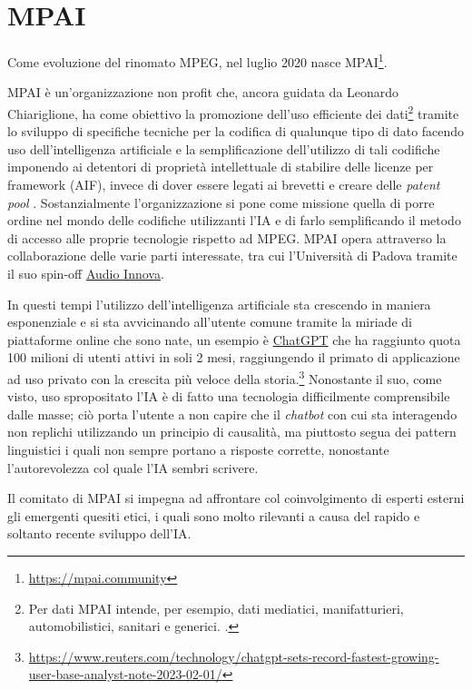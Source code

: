 
\chapter{MPAI} \label{chp:mpai}
Come evoluzione del rinomato \ac{MPEG}, nel luglio 2020 nasce \ac{MPAI}\footnote{\url{https://mpai.community}}.

\ac{MPAI} è un'organizzazione non profit che, ancora guidata da Leonardo Chiariglione, ha come obiettivo la promozione dell'uso efficiente dei dati\footnote{Per dati \ac{MPAI} intende, per esempio, dati mediatici, manifatturieri, automobilistici, sanitari e generici. \cite{mpaiMPAICommunity}.} tramite lo sviluppo di specifiche tecniche per la codifica di qualunque tipo di dato facendo uso dell'intelligenza artificiale e la semplificazione dell'utilizzo di tali codifiche imponendo ai detentori di proprietà intellettuale di stabilire delle licenze per framework (\acs{AIF}), invece di dover essere legati ai brevetti e creare delle \textit{patent pool} \cite{mpaiMPAICommunity}. Sostanzialmente l'organizzazione si pone come missione quella di porre ordine nel mondo delle codifiche utilizzanti l'IA e di farlo semplificando il metodo di accesso alle proprie tecnologie rispetto ad \ac{MPEG}.
\ac{MPAI} opera attraverso la collaborazione delle varie parti interessate, tra cui l'Università di Padova tramite il suo spin-off \href{www.audioinnova.com}{Audio Innova}.

In questi tempi l'utilizzo dell'intelligenza artificiale sta crescendo in maniera esponenziale e si sta avvicinando all'utente comune tramite la miriade di piattaforme online che sono nate, un esempio è \href{https://chat.openai.com}{ChatGPT} che ha raggiunto quota 100 milioni di utenti attivi in soli 2 mesi, raggiungendo il primato di applicazione ad uso privato con la crescita più veloce della storia.\footnote{\url{https://www.reuters.com/technology/chatgpt-sets-record-fastest-growing-user-base-analyst-note-2023-02-01/}} Nonostante il suo, come visto, uso spropositato l'IA è di fatto una tecnologia difficilmente comprensibile dalle masse; ciò porta l'utente a non capire che il \textit{chatbot} con cui sta interagendo non replichi utilizzando un principio di causalità, ma piuttosto segua dei pattern linguistici i quali non sempre portano a risposte corrette, nonostante l'autorevolezza col quale l'IA sembri scrivere.

Il comitato di \ac{MPAI} si impegna ad affrontare col coinvolgimento di esperti esterni gli emergenti quesiti etici, i quali sono molto rilevanti a causa del rapido e soltanto recente sviluppo dell'IA.

